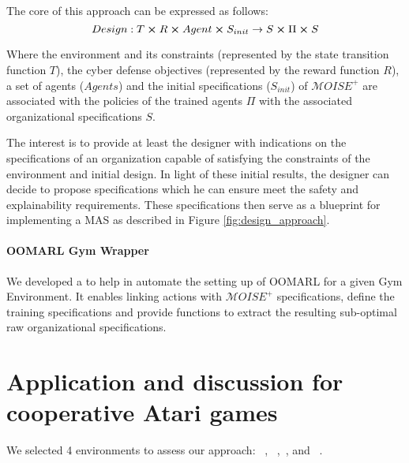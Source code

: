 \documentclass[runningheads]{llncs}
\begin{document}
The core of this approach can be expressed as follows:\begin{equation} %
    Design: T \cross R \cross Agent \cross S_{init} \rightarrow S \cross \Pi \cross S
\end{equation}

Where the environment and its constraints (represented by the state transition function $T$), the cyber defense objectives (represented by the reward function $R$), a set of agents ($Agents$) and the initial specifications ($S_{init}$) of $\mathcal{M}OISE^{+}$ are associated with the policies of the trained agents $\Pi$ with the associated organizational specifications $S$.

The interest is to provide at least the designer with indications on the specifications of an organization capable of satisfying the constraints of the environment and initial design. In light of these initial results, the designer can decide to propose specifications which he can ensure meet the safety and explainability requirements. These specifications then serve as a blueprint for implementing a MAS as described in Figure \ref{fig:design_approach}.

\paragraph{\textbf{OOMARL Gym Wrapper}} We developed a  to help in automate the setting up of OOMARL for a given Gym Environment. It enables linking actions with $\mathcal{M}OISE^+$ specifications, define the training specifications and provide functions to extract the resulting sub-optimal raw organizational specifications.

\section{Application and discussion for cooperative Atari games}

We selected 4 environments to assess our approach: ~\cite{Lowe2017},
~\cite{Kurach2020},~\cite{Terry2021}, and ~\cite{Terry2021}.

\end{document}
